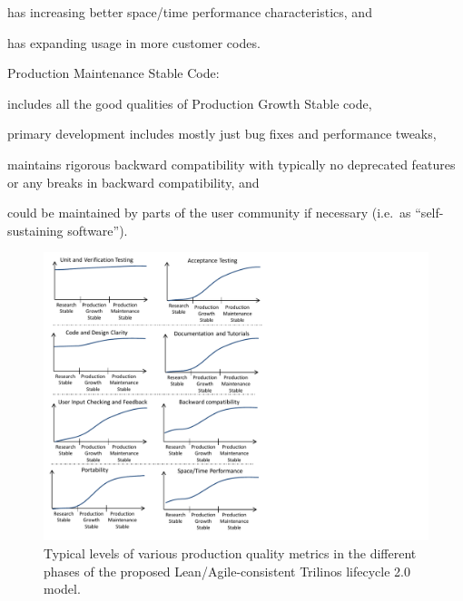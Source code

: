 \documentclass[11pt]{SANDreport}
\begin{document}
\begin{compactenum}
\begin{compactitem}
{}\item has increasing better space/time performance characteristics, and

{}\item has expanding usage in more customer codes.

\end{compactitem}

{}\item Production Maintenance Stable Code:

\begin{compactitem}

{}\item includes all the good qualities of Production Growth Stable
code,

{}\item primary development includes mostly just bug fixes and
performance tweaks,

{}\item maintains rigorous backward compatibility with typically no
deprecated features or any breaks in backward compatibility, and

{}\item could be maintained by parts of the user community if
necessary (i.e.\ as ``self-sustaining software'').

\end{compactitem}

\end{compactenum}

\begin{figure}
\begin{center}
\includegraphics[trim = 0.1in 0.1in 4.0in 0.1in, scale=0.85]
{ImprovementsInDevelopmentPhases}
{}\caption{Typical levels of various production quality metrics in the
different phases of the proposed Lean/Agile-consistent Trilinos
lifecycle 2.0 model.}
\label{fig:ImprovementsInDevelopmentPhases}
\end{center}
\end{figure}
\end{document}
